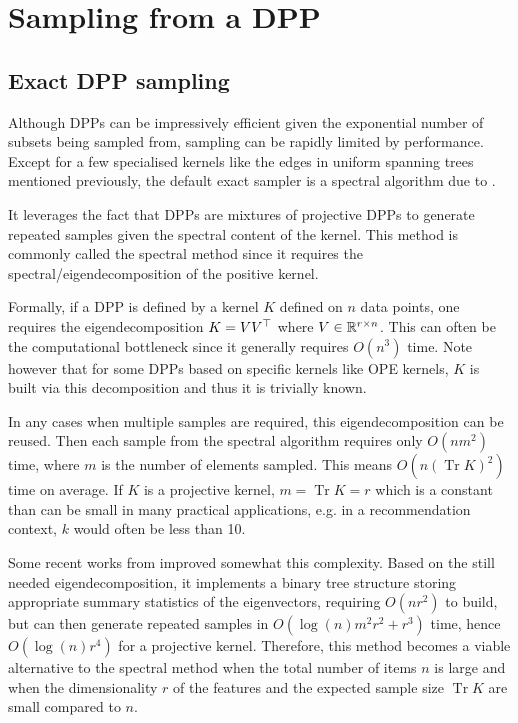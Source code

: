 \section{Sampling from a DPP}
\label{sec__sampling_DPP}
\subsection{Exact DPP sampling}


Although DPPs can be impressively efficient given the exponential number of subsets being sampled from, sampling can be rapidly limited by performance. 
Except for a few specialised kernels like the edges in uniform spanning trees mentioned previously, the default exact sampler is a spectral algorithm due to \cite{hough2006_hkpv}.

It leverages the fact that DPPs are mixtures of projective DPPs to generate repeated samples given the spectral content of the kernel. This method is commonly called the spectral method since it requires the spectral/eigendecomposition of the positive kernel. 

Formally, if a DPP is defined by a kernel $K$ defined on $n$ data points, one requires the eigendecomposition $K= V V^\top$  where $V \in \mathbb{R}^{r \times n}$. 
This can often be the computational bottleneck since it generally requires $O(n^3)$ time. Note however that for some DPPs based on specific kernels like OPE kernels, $K$ is built via this decomposition and thus it is trivially known.

In any cases when multiple samples are required, this eigendecomposition can be reused. Then each sample from the spectral algorithm requires only $O(n m^2)$ time, where $m$ is the number of elements sampled. This means $O(n (\operatorname{Tr} K)^2)$ time on average. If $K$ is a projective kernel, $m = \operatorname{Tr} K = r$ which is a constant than can be small in many practical applications, e.g. in a recommendation context, $k$ would often be less than 10.

Some recent works from \cite{gillenwater2019_treebased_fast_dpp_sampling} improved somewhat this complexity. Based on the still needed eigendecomposition, it implements a binary tree structure storing appropriate summary statistics of the eigenvectors, requiring $O(n r^2)$ to build, but can then generate repeated
samples in $O(\log(n)m^2r^2 + r^3)$ time, hence $O(\log(n)r^4)$ for a projective kernel. Therefore, this method becomes a viable alternative to the spectral method when the total
number of items $n$ is large and when the dimensionality $r$ of the
features and the expected sample size $\operatorname{Tr} K$ are small compared to $n$.





